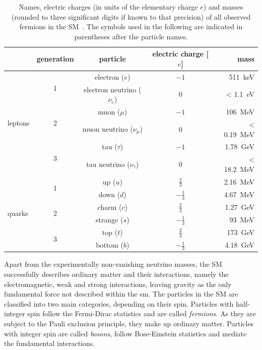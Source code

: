 \begin{table}
	\centering
	\setlength\heavyrulewidth{0.2ex}
	\small
	\caption{Names, electric charges (in units of the elementary charge $e$) and masses (rounded to three significant digits if known to that precision) of all observed fermions in the SM~\cite{pdg2020}. The symbols used in the following are indicated in parentheses after the particle names.}
	\begin{tabular} {l c c c r}
		
		\toprule
				& generation & particle & electric charge [$e$] & mass \\ 
		\midrule 
				\multirow{6}{*}{leptons}& \multirow{2}{*}{1} & electron ($e$)& $-1$ & \SI{511}{\keV}\\
				& & electron neutrino ($\nu_e$) & 0 & < \SI{1.1}{\eV} \\
				& \multirow{2}{*}{2} & muon ($\mu$)& $-1$ & \SI{106}{\MeV}\\
				& & muon neutrino ($\nu_\mu$) & 0 & < \SI{0.19}{\MeV} \\
				& \multirow{2}{*}{3} & tau ($\tau$)& $-1$ & \SI{1.78}{\GeV}\\
				& & tau neutrino ($\nu_\tau$) & 0 & < \SI{18.2}{\MeV} \\
		\midrule 
				\multirow{6}{*}{quarks}& \multirow{2}{*}{1} & up ($u$)& $\frac{2}{3}$ & \SI{2.16}{\MeV}\\
				& & down ($d$) & $-\frac{1}{3}$ & \SI{4.67}{\MeV} \\
				& \multirow{2}{*}{2} & charm ($c$)& $\frac{2}{3}$ & \SI{1.27}{\GeV}\\
				& & strange ($s$) & $-\frac{1}{3}$ &\SI{93}{\MeV} \\
				& \multirow{2}{*}{3} & top ($t$)& $\frac{2}{3}$ & \SI{173}{\GeV}\\
				& & bottom ($b$) & $-\frac{1}{3}$ & \SI{4.18}{\GeV} \\
		\bottomrule
	\end{tabular}\vspace{2mm}
	\label{tab:particles_fermions}   
\end{table}

Apart from the experimentally non-vanishing neutrino masses, the SM successfully describes ordinary matter and their interactions, namely the electromagnetic, weak and strong interactions, leaving gravity as the only fundamental force not described within the \gls{sm}.
The particles in the SM are classified into two main categories, depending on their spin.
Particles with half-integer spin follow the Fermi-Dirac statistics and are called \textit{fermions}. As they are subject to the Pauli exclusion principle, they make up ordinary matter.
Particles with integer spin are called \textit{bosons}, follow Bose-Einstein statistics and mediate the fundamental interactions. 

